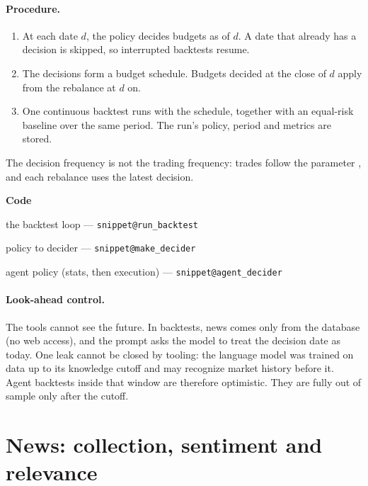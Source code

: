 \documentclass[11pt,a4paper]{article}
\makeatletter
\newcommand{\snippetsource}[1]{\csname snippet@#1\endcsname}
\newcommand{\snippet}[3]{%
  }
\newenvironment{codepointers}{%
  \par\smallskip\begingroup\footnotesize\noindent\textcolor{blue!50!black}{\textbf{Code}}\par\nopagebreak
  \begin{list}{}{\setlength{\leftmargin}{1.2em}\setlength{\itemsep}{0pt}\setlength{\parsep}{0pt}\setlength{\topsep}{1pt}}}%
  {\end{list}\endgroup\smallskip}
\newcommand{\codeitem}[2]{\item #2 --- \texttt{\snippetsource{#1}}}
\makeatother
\begin{document}
\paragraph{Procedure.}
\begin{enumerate}
  \item At each date $d$, the policy decides budgets as of $d$. A date that already has a
        decision is skipped, so interrupted backtests resume.
  \item The decisions form a budget schedule. Budgets decided at the close of $d$ apply
        from the rebalance at $d$ on.
  \item One continuous backtest runs with the schedule, together with an equal-risk
        baseline over the same period. The run's policy, period and metrics are stored.
\end{enumerate}
The decision frequency is not the trading frequency: trades follow the parameter
, and each rebalance uses the latest decision.
\snippet{decision_dates}{Python}{Decision dates}
\snippet{evaluate_decisions}{Python}{Decisions to a backtest, against equal risk}
\begin{codepointers}
  \codeitem{run_backtest}{the backtest loop}
  \codeitem{make_decider}{policy to decider}
  \codeitem{agent_decider}{agent policy (stats, then execution)}
\end{codepointers}

\paragraph{Look-ahead control.} The tools cannot see the future. In backtests, news comes
only from the database (no web access), and the prompt asks the model to treat the decision
date as today. One leak cannot be closed by tooling: the language model was trained on data
up to its knowledge cutoff and may recognize market history before it. Agent backtests
inside that window are therefore optimistic. They are fully out of sample only after the
cutoff.

\section{News: collection, sentiment and relevance}\label{sec:sentiment}
\end{document}
